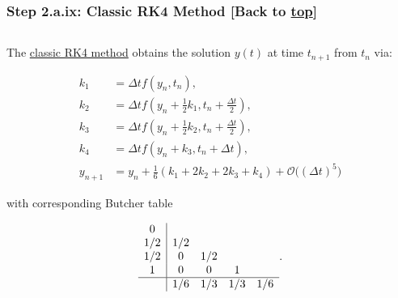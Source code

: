 \documentclass[landscape,letterpaper,10pt,english]{article}
\begin{document}
    \hypertarget{step-2.a.ix-classic-rk4-method-back-to-top}{%
\subsubsection{\texorpdfstring{Step 2.a.ix: Classic RK4 Method {[}Back
to
\hyperref[toc]{top}{]}}{Step 2.a.ix: Classic RK4 Method {[}Back to {]}}}\label{step-2.a.ix-classic-rk4-method-back-to-top}}

\[\label{rkfour}\]

The
\href{https://en.wikipedia.org/w/index.php?title=Runge\%E2\%80\%93Kutta_methods\&oldid=894771467}{classic
RK4 method} obtains the solution \(y(t)\) at time \(t_{n+1}\) from
\(t_n\) via:

\begin{align}
k_1 &= \Delta tf(y_n, t_n), \\
k_2 &= \Delta tf(y_n + \frac{1}{2}k_1, t_n + \frac{\Delta t}{2}), \\
k_3 &= \Delta tf(y_n + \frac{1}{2}k_2, t_n + \frac{\Delta t}{2}), \\
k_4 &= \Delta tf(y_n + k_3, t_n + \Delta t), \\
y_{n+1} &= y_n + \frac{1}{6}(k_1 + 2k_2 + 2k_3 + k_4) + \mathcal{O}\big((\Delta t)^5\big)
\end{align}

with corresponding Butcher table

\[\begin{array}{c|cccc}
    0 & \\
    1/2 & 1/2 & \\ 
    1/2 & 0 & 1/2 & \\
    1 & 0 & 0 & 1 & \\ \hline
     & 1/6 & 1/3 & 1/3 & 1/6
\end{array}. \]
\end{document}
